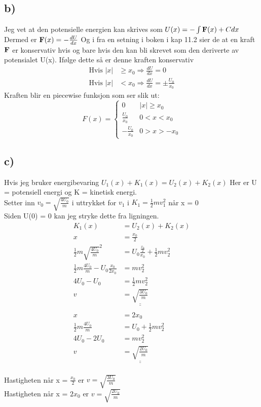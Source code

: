 \documentclass[a4paper,12pt,norsk]{article}
\begin{document}
\subsection*{b)}
Jeg vet at den potensielle energien kan skrives som $U(x) = - \int \bold{F}(x) + C dx$ Dermed er $\bold{F}(x) = -\frac{dU}{dx}$ Og i fra en setning i boken i kap 11.2 sier de at en kraft $\bold{F}$ er konservativ hvis og bare hvis den kan bli skrevet som den deriverte av potensialet U(x). Ifølge dette så er denne kraften konservativ\\
\begin{align*}
\textrm{Hvis } |x|& \geq x_0 \Rightarrow \frac{dU}{dx} = 0\\
\textrm{Hvis } |x|& <x_0 \Rightarrow \frac{dU}{dx} = \pm \frac{U_0}{x_0}
\end{align*}
Kraften blir en piecewise funksjon som ser slik ut:
\[ F(x) = \begin{cases}
0 & |x|\geq x_0\\
\frac{U_0}{x_0} & 0 < x <x_0\\
-\frac{U_0}{x_0} & 0 > x > -x_0
\end{cases}\]


\subsection*{c)}
Hvis jeg bruker energibevaring $U_1(x) + K_1(x) = U_2(x) + K_2(x)$ Her er U = potensiell energi og K = kinetisk energi.\\
Setter inn $v_0 = \sqrt{\frac{4U_0}{m}}$ i uttrykket for $v_1$ i $K_1 = \frac{1}{2}mv_1^2$ når x = 0\\
Siden U(0) = 0 kan jeg stryke dette fra ligningen.
\begin{align*}
K_1(x) &= U_2(x) + K_2(x)\\
x &= \frac{x_0}{2}\\
\frac{1}{2}m\sqrt{\frac{4U_0}{m}}^2 &= U_0\frac{\frac{x_0}{2}}{x_0} + \frac{1}{2}mv_2^2\\
\frac{1}{2}m \frac{4U_0}{m} -  U_0\frac{x_0}{2x_0}&= mv_2^2\\
4U_0 - U_0 &= \frac{1}{2}mv_2^2\\
v &= \underline{\underline{\sqrt{\frac{3U_0}{m}}}}\\
\\
x &= 2x_0\\
\frac{1}{2}m\frac{4U_0}{m} &=  U_0 + \frac{1}{2}mv_2^2\\
4U_0 - 2U_0 &= mv_2^2\\
v &=\underline{\underline{\sqrt{\frac{2U_0}{m}}}}
\end{align*}\\
Hastigheten når x = $\frac{x_0}{2}$ er $v = \sqrt{\frac{3U_0}{m}}$\\
Hastigheten når x = $2x_0$ er $v = \sqrt{\frac{2U_0}{m}}$
\end{document}
